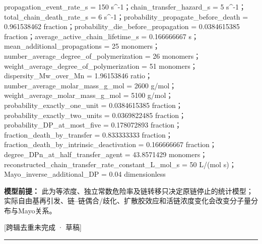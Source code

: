 \documentclass[UTF8,11pt,a4paper]{ctexart}
\begin{document}
propagation\_event\_rate\_s = 150 s\textasciicircum{}-1；chain\_transfer\_hazard\_s = 5 s\textasciicircum{}-1；total\_chain\_death\_rate\_s = 6 s\textasciicircum{}-1；probability\_propagate\_before\_death = 0.961538462 fraction；probability\_die\_before\_propagation = 0.0384615385 fraction；average\_active\_chain\_lifetime\_s = 0.166666667 s；mean\_additional\_propagations = 25 monomers；number\_average\_degree\_of\_polymerization = 26 monomers；weight\_average\_degree\_of\_polymerization = 51 monomers；dispersity\_Mw\_over\_Mn = 1.96153846 ratio；number\_average\_molar\_mass\_g\_mol = 2600 g/mol；weight\_average\_molar\_mass\_g\_mol = 5100 g/mol；probability\_exactly\_one\_unit = 0.0384615385 fraction；probability\_exactly\_two\_units = 0.0369822485 fraction；probability\_DP\_at\_most\_five = 0.178072893 fraction；fraction\_death\_by\_transfer = 0.833333333 fraction；fraction\_death\_by\_intrinsic\_deactivation = 0.166666667 fraction；degree\_DPn\_at\_half\_transfer\_agent = 43.8571429 monomers；reconstructed\_chain\_transfer\_rate\_constant\_L\_mol\_s = 50 L/(mol s)；Mayo\_inverse\_additional\_DP = 0.04 dimensionless\par
\noindent\textbf{模型前提：}
此为等浓度、独立常数危险率及链转移只决定原链停止的统计模型；实际自由基再引发、链–链偶合/歧化、扩散胶效应和活链浓度变化会改变分子量分布与Mayo关系。\par
\noindent\textcolor{red!65!black}{[跨辑去重未完成 · 草稿]} \par
\medskip\hrule\medskip
{}
\end{document}
